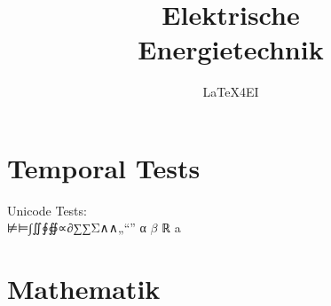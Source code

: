 \documentclass[color,german]{latex4ei/latex4ei_sheet}
\title{Elektrische \\ Energietechnik}
\author{LaTeX4EI}					%
\begin{document}
\maketitle	%

\section{Temporal Tests}

Unicode Tests:\\
⊭⊨∫∬∮∯∝∂∑∑Σ∧∧„“” α $β$ ℝ a



\section{Mathematik}
\end{document}

